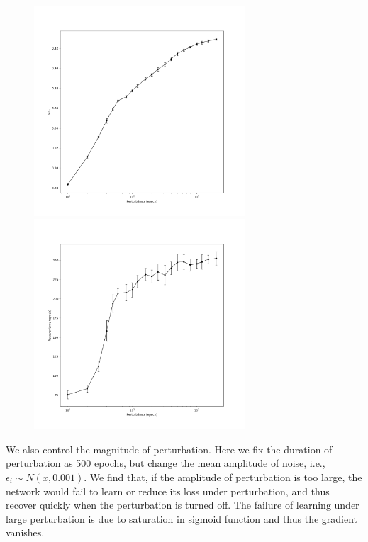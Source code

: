 \documentclass[12pt, a4paper]{article}
\begin{document}
\begin{figure}[H]
    \centering
    \includegraphics[width=0.7\textwidth]{FNN/fig/0214_abb05_perturb_auc.png} \\
    \includegraphics[width=0.7\textwidth]{FNN/fig/0214_abb05_perturb_rectime.png}
\end{figure}

\newpage

We also control the magnitude of perturbation. Here we fix the duration of perturbation as 500 epochs, but change the mean amplitude of noise, i.e., $\epsilon_i \sim N(x, 0.001)$. We find that, if the amplitude of perturbation is too large, the network would fail to learn or reduce its loss under perturbation, and thus recover quickly when the perturbation is turned off. The failure of learning under large perturbation is due to saturation in sigmoid function and thus the gradient vanishes.
\end{document}
